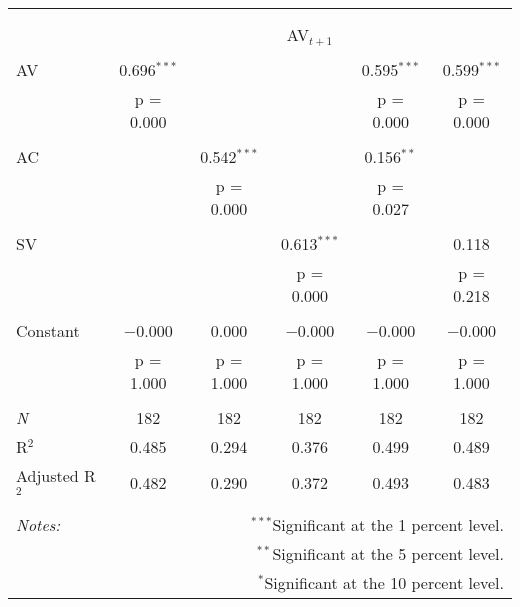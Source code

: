 
\begin{tabular}{@{\extracolsep{5pt}}lccccc} 
\\[-1.8ex]\hline 
\hline \\[-1.8ex] 
\\[-1.8ex] & \multicolumn{5}{c}{AV$_{t+1}$} \\ 
\hline \\[-1.8ex] 
 AV & 0.696$^{***}$ &  &  & 0.595$^{***}$ & 0.599$^{***}$ \\ 
  & p = 0.000 &  &  & p = 0.000 & p = 0.000 \\ 
  & & & & & \\ 
 AC &  & 0.542$^{***}$ &  & 0.156$^{**}$ &  \\ 
  &  & p = 0.000 &  & p = 0.027 &  \\ 
  & & & & & \\ 
 SV &  &  & 0.613$^{***}$ &  & 0.118 \\ 
  &  &  & p = 0.000 &  & p = 0.218 \\ 
  & & & & & \\ 
 Constant & $-$0.000 & 0.000 & $-$0.000 & $-$0.000 & $-$0.000 \\ 
  & p = 1.000 & p = 1.000 & p = 1.000 & p = 1.000 & p = 1.000 \\ 
  & & & & & \\ 
\textit{N} & 182 & 182 & 182 & 182 & 182 \\ 
R$^{2}$ & 0.485 & 0.294 & 0.376 & 0.499 & 0.489 \\ 
Adjusted R$^{2}$ & 0.482 & 0.290 & 0.372 & 0.493 & 0.483 \\ 
\hline 
\hline \\[-1.8ex] 
\textit{Notes:} & \multicolumn{5}{r}{$^{***}$Significant at the 1 percent level.} \\ 
 & \multicolumn{5}{r}{$^{**}$Significant at the 5 percent level.} \\ 
 & \multicolumn{5}{r}{$^{*}$Significant at the 10 percent level.} \\ 
\end{tabular} 
